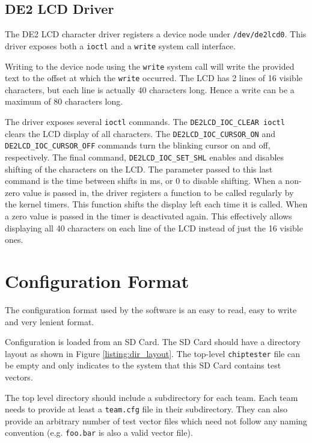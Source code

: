 \subsection{DE2 LCD Driver}
The DE2 LCD character driver registers a device node under \texttt{/dev/de2lcd0}.
This driver exposes both a \texttt{ioctl} and a \texttt{write} system call interface.

Writing to the device node using the \texttt{write} system call will write the provided
text to the offset at which the \texttt{write} occurred. The LCD has 2 lines of 16 visible characters,
but each line is actually 40 characters long. Hence a write can be a maximum of 80 characters long.

The driver exposes several \texttt{ioctl} commands. The \texttt{DE2LCD\_IOC\_CLEAR ioctl}
clears the LCD display of all characters. The \texttt{DE2LCD\_IOC\_CURSOR\_ON} and
\\
\texttt{DE2LCD\_IOC\_CURSOR\_OFF} commands turn the blinking cursor on and off, respectively.
The final command, \texttt{DE2LCD\_IOC\_SET\_SHL} enables and disables shifting of the
characters on the LCD. The parameter passed to this last command is the time between shifts
in ms, or 0 to disable shifting. When a non-zero value is passed in, the driver registers
a function to be called regularly by the kernel timers. This function shifts the display
left each time it is called. When a zero value is passed in the timer is deactivated again.
This effectively allows displaying all 40 characters on each line of the LCD instead of just
the 16 visible ones.




\newpage
\section{Configuration Format}
The configuration format used by the software is an easy to read, easy to write and very
lenient format.

Configuration is loaded from an SD Card. The SD Card should have a directory layout
as shown in Figure \ref{listing:dir_layout}.
The top-level \texttt{chiptester} file can be empty and only
indicates to the system that this SD Card contains test vectors.

The top level directory should include a subdirectory for each team. Each team needs
to provide at least a \texttt{team.cfg} file in their subdirectory. They can also provide
an arbitrary number of test vector files which need not follow any naming
convention (e.g. \texttt{foo.bar} is also a valid vector file).

